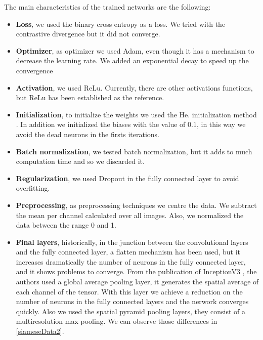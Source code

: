 The main characteristics of the trained networks are the following:

\begin{itemize}

\item \textbf{Loss}, we used the binary cross entropy as a loss. We tried with the contrastive divergence but it did not converge.

\item \textbf{Optimizer}, as optimizer we used Adam, even though it has a mechanism to decrease the learning rate. We added an exponential decay to speed up the convergence

\item \textbf{Activation}, we used ReLu. Currently, there are other activations functions, but ReLu has been established as the reference.

\item \textbf{Initialization}, to initialize the weights we used the He. initialization method \cite{hemethod}. In addition we initialized the biases with the value of $0.1$, in this way we avoid the dead neurons in the firsts iterations.

\item \textbf{Batch normalization}, we tested batch normalization, but it adds to much computation time and so we discarded it.

\item \textbf{Regularization}, we used Dropout in the fully connected layer to avoid overfitting.

\item \textbf{Preprocessing}, as preprocessing techniques we centre the data.  We subtract the mean per channel calculated over all images. Also, we normalized the data between the range 0 and 1.

\item \textbf{Final layers}, historically, in the junction between the convolutional layers and the fully connected layer, a flatten mechanism has been used, but it increases dramatically the number of neurons in the fully connected layer, and it shows problems to converge. From the publication of InceptionV3 \cite{inception33}, the authors used a global average pooling layer, it generates the spatial average of each channel of the tensor. With this layer we achieve a reduction on the number of neurons in the fully connected layers and the nerwork converges quickly. Also we used the spatial pyramid pooling layers, they consist of a multiresolution max pooling. We can observe those differences in \ref{siameseData2}.


\end{itemize}
